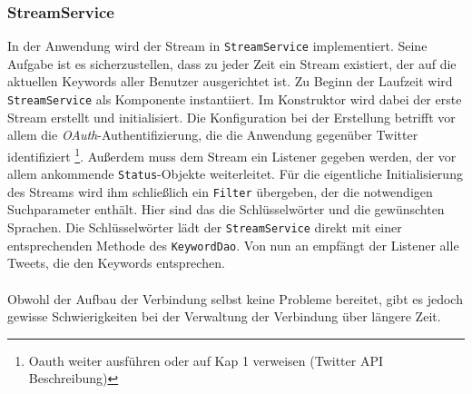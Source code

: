 \subsubsection*{StreamService}
In der Anwendung wird der Stream in \texttt{StreamService} implementiert. Seine Aufgabe ist es 
sicherzustellen, dass zu jeder Zeit ein Stream existiert, der auf die aktuellen Keywords aller 
Benutzer ausgerichtet ist. Zu Beginn der Laufzeit wird \texttt{StreamService} als Komponente 
instantiiert. Im Konstruktor wird dabei der erste Stream erstellt und initialisiert. Die Konfiguration 
bei der Erstellung betrifft vor allem die \textit{OAuth}-Authentifizierung, die die Anwendung 
gegenüber Twitter identifiziert \footnote{Oauth weiter ausführen oder auf Kap 1 verweisen (Twitter API 
Beschreibung)}. Außerdem muss dem Stream ein Listener gegeben werden, der vor allem ankommende 
\texttt{Status}-Objekte weiterleitet. Für die eigentliche Initialisierung des Streams wird ihm schließlich ein 
\texttt{Filter} übergeben, der die notwendigen Suchparameter enthält. Hier sind das die Schlüsselwörter und die 
gewünschten Sprachen. Die Schlüsselwörter lädt der \texttt{StreamService} direkt mit einer entsprechenden 
Methode des \texttt{KeywordDao}. Von nun an empfängt der Listener alle Tweets, die den Keywords entsprechen. 
\\\\
Obwohl der Aufbau der Verbindung selbst keine Probleme bereitet, gibt es jedoch gewisse Schwierigkeiten 
bei der Verwaltung der Verbindung über längere Zeit.
